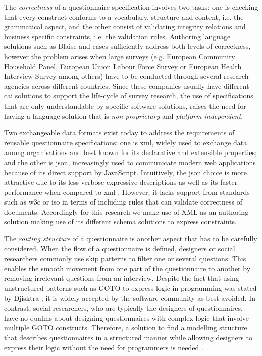 	The \emph{correctness} of a questionnaire specification involves two tasks: one is checking that every construct conforms to a vocabulary, structure and content, i.e. the grammatical aspect, and the other consist of validating integrity relations and business specific constraints, i.e. the validation rules. Authoring language solutions such as Blaise and \gls{cases} sufficiently address both levels of correctness, however the problem arises when large surveys (e.g. European Community Household Panel, European Union Labour Force Survey or European Health Interview Survey among others) have to be conducted through several research agencies across different countries. Since these companies usually have different \gls{cai} solutions to support the life-cycle of survey research, the use of specifications that are only understandable by specific software solutions, raises the need for having a language solution that is \emph{non-proprietary} and \emph{platform independent}.

	Two exchangeable data formats exist today to address the requirements of reusable questionnaire specifications: one is \gls{xml}, widely used to exchange data among organisations and best known for its declarative and extensible properties; and the other is \gls{json}, increasingly used to communicate modern web applications because of its direct support by JavaScript. Intuitively, the \gls{json} choice is more attractive due to its less verbose expressive descriptions as well as its faster performance when compared to \gls{xml} \cite{art:nurseitov09}. However, it lacks support from standards such as \gls{w3c} or \gls{iso} in terms of including rules that can validate correctness of documents. Accordingly for this research we make use of XML as an authoring solution making use of its different schema solutions to express constraints. %

	The \emph{routing structure} of a questionnaire is another aspect that has to be carefully considered. When the flow of a questionnaire is defined, designers or social researchers commonly use skip patterns to filter one or several questions. This enables the smooth movement from one part of the questionnaire to another by removing irrelevant questions from an interview. Despite the fact that using unstructured patterns such as GOTO to express logic in programming was stated by Djisktra \cite{art:dijkstra68}, it is widely accepted by the software community as best avoided. In contrast, social researchers, who are typically the designers of questionnaires, have no qualms about designing questionnaires with complex logic that involve multiple GOTO constructs. Therefore, a solution to find a modelling structure that describes questionnaires in a structured manner while allowing designers to express their logic without the need for programmers is needed \cite{masterthesis:madsen09}.

